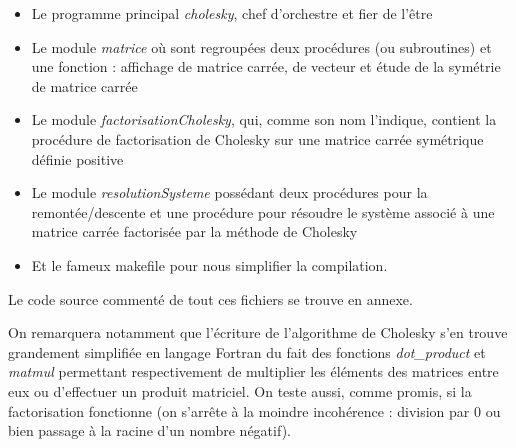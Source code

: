 \documentclass[a4paper, titlepage]{livret}													%
\begin{document}
		\begin{itemize}
			\item Le programme principal \textit{cholesky}, chef d'orchestre et fier de l'être
			\item Le module \textit{matrice} où sont regroupées deux procédures (ou subroutines) et une fonction : affichage de matrice carrée, de vecteur et étude de la symétrie de matrice carrée
			\item Le module \textit{factorisationCholesky}, qui, comme son nom l'indique, contient la procédure de factorisation de Cholesky sur une matrice carrée symétrique définie positive
			\item Le module \textit{resolutionSysteme} possédant deux procédures pour la remontée/descente et une procédure pour résoudre le système associé à une matrice carrée factorisée par la méthode de Cholesky  
			\item Et le fameux makefile pour nous simplifier la compilation.
		\end{itemize}

		Le code source commenté de tout ces fichiers se trouve en annexe.

		On remarquera notamment que l'écriture de l'algorithme de Cholesky s'en trouve grandement simplifiée en langage Fortran du fait des fonctions \textit{dot\_product} et \textit{matmul} permettant respectivement de multiplier les éléments des matrices entre eux ou d'effectuer un produit matriciel.
		On teste aussi, comme promis, si la factorisation fonctionne (on s'arrête à la moindre incohérence : division par $0$ ou bien passage à la racine d'un nombre négatif).
\end{document}
